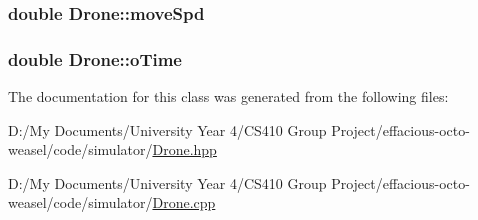 \subsubsection[{\texorpdfstring{move\+Spd}{moveSpd}}]{\setlength{\rightskip}{0pt plus 5cm}double Drone\+::move\+Spd\hspace{0.3cm}{\ttfamily [private]}}\hypertarget{class_drone_a97270a4291d82a57331669171bd80bc1}{}\label{class_drone_a97270a4291d82a57331669171bd80bc1}
\subsubsection[{\texorpdfstring{o\+Time}{oTime}}]{\setlength{\rightskip}{0pt plus 5cm}double Drone\+::o\+Time\hspace{0.3cm}{\ttfamily [private]}}\hypertarget{class_drone_a58d0d1070b3339121051cb88c8edc5bf}{}\label{class_drone_a58d0d1070b3339121051cb88c8edc5bf}


The documentation for this class was generated from the following files\+:\begin{DoxyCompactItemize}
\item 
D\+:/\+My Documents/\+University Year 4/\+C\+S410 Group Project/effacious-\/octo-\/weasel/code/simulator/\hyperlink{_drone_8hpp}{Drone.\+hpp}\item 
D\+:/\+My Documents/\+University Year 4/\+C\+S410 Group Project/effacious-\/octo-\/weasel/code/simulator/\hyperlink{_drone_8cpp}{Drone.\+cpp}\end{DoxyCompactItemize}
